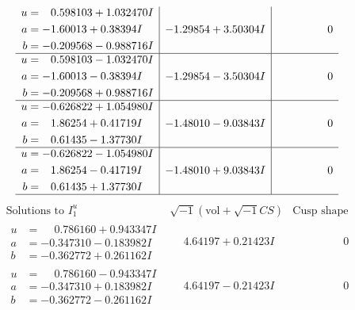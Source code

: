 \documentclass[1p]{elsarticle_modified}
\theoremstyle{definition}
\newcommand{\I}{\sqrt{-1}}
\begin{document}
$$\begin{array}{c|c|c}
\begin{aligned}
u &= \phantom{-}0.598103 + 1.032470 I \\
a &= -1.60013 + 0.38394 I \\
b &= -0.209568 - 0.988716 I\end{aligned}
 & -1.29854 + 3.50304 I & \phantom{-0.000000 } 0 \\ \hline\begin{aligned}
u &= \phantom{-}0.598103 - 1.032470 I \\
a &= -1.60013 - 0.38394 I \\
b &= -0.209568 + 0.988716 I\end{aligned}
 & -1.29854 - 3.50304 I & \phantom{-0.000000 } 0 \\ \hline\begin{aligned}
u &= -0.626822 + 1.054980 I \\
a &= \phantom{-}1.86254 + 0.41719 I \\
b &= \phantom{-}0.61435 - 1.37730 I\end{aligned}
 & -1.48010 - 9.03843 I & \phantom{-0.000000 } 0 \\ \hline\begin{aligned}
u &= -0.626822 - 1.054980 I \\
a &= \phantom{-}1.86254 - 0.41719 I \\
b &= \phantom{-}0.61435 + 1.37730 I\end{aligned}
 & -1.48010 + 9.03843 I & \phantom{-0.000000 } 0\\
 \hline 
 \end{array}$$\newpage$$\begin{array}{c|c|c}  
\text{Solutions to }I^u_{1}& \I (\text{vol} + \sqrt{-1}CS) & \text{Cusp shape}\\
 \hline 
\begin{aligned}
u &= \phantom{-}0.786160 + 0.943347 I \\
a &= -0.347310 - 0.183982 I \\
b &= -0.362772 + 0.261162 I\end{aligned}
 & \phantom{-}4.64197 + 0.21423 I & \phantom{-0.000000 } 0 \\ \hline\begin{aligned}
u &= \phantom{-}0.786160 - 0.943347 I \\
a &= -0.347310 + 0.183982 I \\
b &= -0.362772 - 0.261162 I\end{aligned}
 & \phantom{-}4.64197 - 0.21423 I & \phantom{-0.000000 } 0 \\ \hline\begin{aligned}

\end{aligned}
\end{array}$$
\end{document}
